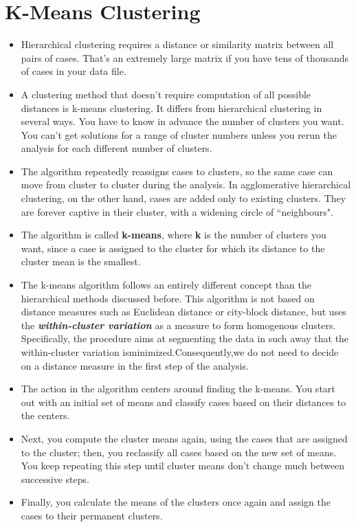 \documentclass[a4paper,12pt]{article}
\begin{document}
	
	\tableofcontents
	\newpage
	


\section{K-Means Clustering}
\begin{itemize}
	\item Hierarchical clustering requires a distance or similarity matrix between all pairs of cases. That's an extremely large matrix if you have tens of thousands of cases in your data file.
	
	\item A clustering method that doesn't require computation of all possible distances is k-means clustering. It differs from hierarchical clustering in several ways. You have to know in advance the number of clusters you want. You can't get solutions for a range of cluster numbers unless you rerun the analysis for each different number of clusters.
	
	\item The algorithm repeatedly reassigns cases to clusters, so the same case can move from cluster to cluster during the analysis. In agglomerative hierarchical clustering, on the other hand, cases are added only to existing clusters. They are forever captive in their cluster, with a widening circle of ``neighbours".
	
	\item The algorithm is called \textbf{k-means}, where \textbf{k} is the number of clusters you want, since a case is assigned to the cluster for which its distance to the cluster mean is the smallest.
	
	\item The k-means algorithm follows an entirely different concept than the hierarchical methods
	discussed before. This algorithm is not based on distance measures such as
	Euclidean distance or city-block distance, but uses the \textbf{\textit{within-cluster variation}} as a measure to form homogenous clusters. Specifically, the procedure aims at segmenting
	the data in such away that the within-cluster variation isminimized.Consequently,we
	do not need to decide on a distance measure in the first step of the analysis.
	
	\item The action in the algorithm centers around finding the k-means. You start out with an initial set of means and classify cases based on their distances to the centers.
	
	\item Next, you compute the cluster means again, using the cases that are assigned to the cluster; then, you reclassify all cases based on the new set of means. You keep repeating this step until cluster means don't change much between successive steps.
	
	\item Finally, you calculate the means of the clusters once again and assign the cases to their permanent clusters.
\end{itemize}
\end{document}
